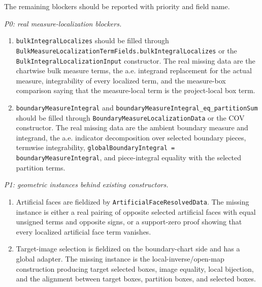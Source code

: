 \begin{remark}
  \label{anc:m8_p0_p1_p2_blocker_ledger}
  \begingroup\raggedright
  The remaining blockers should be reported with priority and field name.

  \emph{P0: real measure-localization blockers.}
  \begin{enumerate}
    \item \texttt{bulkIntegralLocalizes} should be filled through
      \texttt{BulkMeasureLocalizationTermFields.bulkIntegralLocalizes} or the
      \texttt{BulkIntegralLocalizationInput} constructor.  The real missing
      data are the chartwise bulk measure terms, the a.e. integrand
      replacement for the actual measure, integrability of every localized
      term, and the measure-box comparison saying that the measure-local term
      is the project-local box term.
    \item \texttt{boundaryMeasureIntegral} and
      \texttt{boundaryMeasureIntegral\_eq\_partitionSum} should be filled
      through \texttt{BoundaryMeasureLocalizationData} or the COV constructor.
      The real missing data are the ambient boundary measure and integrand, the
      a.e. indicator decomposition over selected boundary pieces, termwise
      integrability, \texttt{globalBoundaryIntegral = boundaryMeasureIntegral},
      and piece-integral equality with the selected partition terms.
  \end{enumerate}

  \emph{P1: geometric instances behind existing constructors.}
  \begin{enumerate}
    \item Artificial faces are fieldized by
      \texttt{ArtificialFaceResolvedData}.  The missing instance is either a
      real pairing of opposite selected artificial faces with equal unsigned
      terms and opposite signs, or a support-zero proof showing that every
      localized artificial face term vanishes.
    \item Target-image selection is fieldized on the boundary-chart side and
      has a global adapter.  The missing instance is the local-inverse/open-map
      construction producing target selected boxes, image equality, local
      bijection, and the alignment between target boxes, partition boxes, and
      selected boxes.
  \end{enumerate}


\end{remark}
